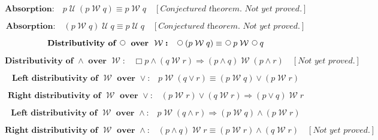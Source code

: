 \documentclass[fleqn, leqno]{article}
\newcommand{\impl}{\ensuremath{\Rightarrow}}        %
\newcommand{\Until}{\;\mathcal{U}\;}
\newcommand{\Wait}{\;\mathcal{W}\;}
\newcommand{\Next}{\;\,\text{\raisebox{3.5pt}{\circle{6}}}}
\newcommand{\Always}{\Box}
\newcommand{\spacer}{\vspace{-30pt}}
\begin{document}
\spacer

\begin{equation}\label{E:leftUntilAbsWait}
\textbf{Absorption:}\quad p \Until (p \Wait q) \equiv p \Wait q \quad [\textit{Conjectured theorem. Not yet proved.}]
\end{equation}

\spacer

\begin{equation}\label{E:rightUntilAbsWait}
\textbf{Absorption:}\quad (p \Wait q) \Until q \equiv p \Until q \quad [\textit{Conjectured theorem. Not yet proved.}]
\end{equation}

\spacer

\begin{equation}\label{E:waitNextDist}
\textbf{Distributivity of $\Next$ over $\Wait$:}\quad \Next (p \Wait q) \equiv \Next p \Wait \Next q
\end{equation}

\spacer

\begin{equation}\label{E:andWaitDist}
\textbf{Distributivity of $\land$ over $\Wait$:}\quad \Always p \land (q \Wait r) \impl (p \land q) \Wait (p \land r) \quad [\textit{Not yet proved.}]
\end{equation}

\spacer

\begin{equation}\label{E:waitOrDist}
\textbf{Left distributivity of $\Wait$ over $\lor$:}\quad p \Wait (q \lor r) \equiv (p \Wait q) \lor (p \Wait r)
\end{equation}

\spacer

\begin{equation}\label{E:rightWaitOrDist}
\textbf{Right distributivity of $\Wait$ over $\lor$:}\quad (p \Wait r) \lor (q \Wait r) \impl (p \lor q) \Wait r
\end{equation}

\spacer

\begin{equation}\label{E:leftWaitAndDist}
\textbf{Left distributivity of $\Wait$ over $\land$:}\quad p \Wait (q \land r) \impl (p \Wait q) \land (p \Wait r)
\end{equation}

\spacer

\begin{equation}\label{E:rightWaitAndDist}
\textbf{Right distributivity of $\Wait$ over $\land$:}\quad (p \land q) \Wait r \equiv (p \Wait r) \land (q \Wait r) \quad [\textit{Not yet proved.}]
\end{equation}
\end{document}
